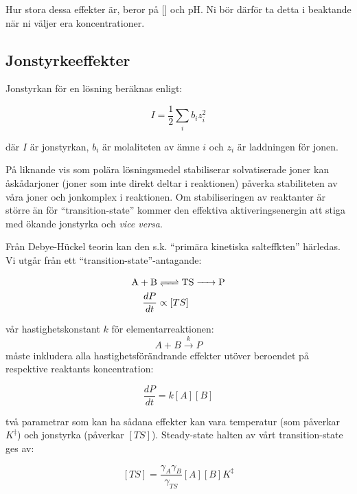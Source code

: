 Hur stora dessa effekter är, beror på [] och pH. Ni
bör därför ta detta i beaktande när ni väljer era koncentrationer.

\subsection{Jonstyrkeeffekter}
Jonstyrkan för en lösning beräknas enligt:

\begin{equation}
  \label{eq:ionic-strength}
  I = \frac{1}{2}\sum_i b_iz_i^2
\end{equation}

där $I$ är jonstyrkan, $b_i$ är molaliteten av ämne $i$ och $z_i$ är
laddningen för jonen.

På liknande vis som polära lösningsmedel stabiliserar
solvatiserade joner kan åskådarjoner (joner som inte
direkt deltar i reaktionen) påverka stabiliteten av våra joner och
jonkomplex i reaktionen. Om stabiliseringen av reaktanter är större än
för ``transition-state'' kommer den effektiva aktiveringsenergin att
stiga med ökande jonstyrka och \emph{vice versa}.

Från Debye-Hückel teorin kan den s.k. ``primära kinetiska
salteffkten'' härledas. Vi utgår från ett ``transition-state''-antagande:

\begin{align}
  \label{eq:ts}
  \ce{A + B} & \ce{<=> TS -> P} \\
  \label{eq:dpdt-propto}
  \frac{dP}{dt} &\propto [TS]
\end{align}

vår hastighetskonstant $k$ för elementarreaktionen:
\begin{equation}
  A + B \overset{k}{\rightarrow} P
\end{equation}
måste inkludera alla hastighetsförändrande effekter utöver beroendet på
respektive reaktants koncentration:

\begin{equation}
  \label{eq:dpdt-explicit}
  \frac{dP}{dt} = k[A][B]
\end{equation}

två parametrar som kan ha sådana effekter kan vara temperatur (som
påverkar $K^\ddagger$) och jonstyrka (påverkar $[TS]$). Steady-state
halten av vårt transition-state ges av:

\begin{equation}
  \label{eq:ts-conc}
  [TS] = \frac{\gamma_A\gamma_B}{\gamma_{TS}}[A][B]K^\ddagger
\end{equation}


